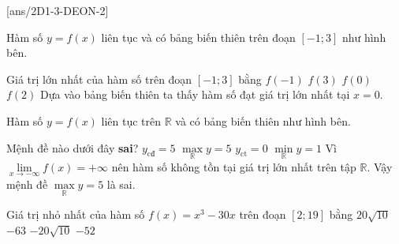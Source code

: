 \boxde
\BTTN
{}[ans/2D1-3-DEON-2]
\begin{ex}%
    Hàm số $y=f(x)$ liên tục và có bảng biến thiên trên đoạn $[-1;3]$ như hình bên.
    \begin{center}
    \end{center}
    Giá trị lớn nhất của hàm số trên đoạn $[-1;3]$ bằng
    \choice
    {$f(-1)$}
    {$f(3)$}
    { \True $f(0)$}
    { $f(2)$}
    \loigiai
    {
        Dựa vào bảng biến thiên ta thấy hàm số đạt giá trị lớn nhất tại $x=0$.
    }
\end{ex}
\begin{ex}%
    Hàm số $y=f(x)$ liên tục trên $\mathbb{R}$ và có bảng biến thiên như hình bên.
    \begin{center}
    \end{center}
    Mệnh đề nào dưới đây\textbf{ sai}?
    \choice
    {$y_\text{cđ}=5$}
    {\True $\max\limits_{\mathbb{R}}y=5$}
    {$y_\text{ct}=0$}
    {$\min\limits_{\mathbb{R}}y=1$}
    \loigiai
    {
        Vì $\lim \limits_{x \to -\infty} f(x)=+\infty$ nên hàm số không tồn tại giá trị lớn nhất trên tập $\mathbb{R}$. Vậy mệnh đề $\max\limits_{\mathbb{R}}y=5$ là sai.
    }
\end{ex}
\begin{ex}%
    Giá trị nhỏ nhất của hàm số $f(x)=x^3-30x$ trên đoạn $[2;19]$ bằng
    \choice
    {$20\sqrt{10}$}
    {$-63$}
    {\True $-20\sqrt{10}$}
    {$-52$}
\end{ex}
